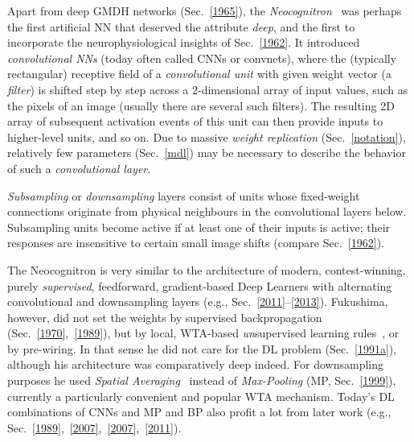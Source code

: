 \documentclass[letterpaper]{article}
\begin{document}
\begin{CJK*}{UTF8}{gbsn}
\begin{sloppypar}
Apart from deep GMDH networks (Sec.~\ref{1965}),
the {\em Neocognitron}~\citep{Fukushima:1979neocognitron,fukushima:1980,Fukushima:2013}
was perhaps the first artificial NN that deserved the attribute {\em deep}, and the first 
to incorporate the  neurophysiological insights of Sec.~\ref{1962}. 
It introduced {\em convolutional NNs} (today often called CNNs or convnets), where the
(typically rectangular) receptive field of a {\em convolutional unit} with given weight vector (a {\em filter})
is shifted step by step across a 2-dimensional array of input values, such as the pixels of an image (usually there are several such filters). 
The resulting 2D array of subsequent activation events of this unit can then provide inputs to higher-level units, and so on.
Due to massive {\em weight replication} (Sec.~\ref{notation}),  
relatively few parameters (Sec.~\ref{mdl}) 
may be necessary to describe the behavior of such a {\em convolutional layer}.

{\em Subsampling} or {\em downsampling} layers consist of units whose fixed-weight connections originate from physical neighbours in the convolutional layers below. 
Subsampling units become active if at least one of their inputs is active;
their responses are insensitive to certain small image shifts (compare Sec.~\ref{1962}).



The Neocognitron is
very similar to the architecture of modern, contest-winning, purely {\em  supervised}, 
feedforward, gradient-based Deep Learners with alternating convolutional and downsampling layers
(e.g., Sec.~\ref{2011}--\ref{2013}).
Fukushima, however, did not set the weights by supervised
backpropagation (Sec.~\ref{1970},~\ref{1989}),
but by local, WTA-based
{\em un}supervised learning rules~\citep[e.g.,][]{Fukushima:2013b}, or by pre-wiring. 
In that sense he did not care for the  
DL problem (Sec.~\ref{1991a}), 
although his architecture was comparatively deep indeed. For downsampling purposes
he used {\em  Spatial Averaging}~\citep{fukushima:1980,Fukushima:2011} instead of {\em Max-Pooling} (MP, Sec.~\ref{1999}),
currently a particularly convenient and popular WTA mechanism. 
Today's DL combinations of CNNs and MP and BP also profit a lot from
later work (e.g., Sec.~\ref{1989},~\ref{2007},~\ref{2007},~\ref{2011}).



\end{sloppypar}
\end{CJK*}
\end{document}
